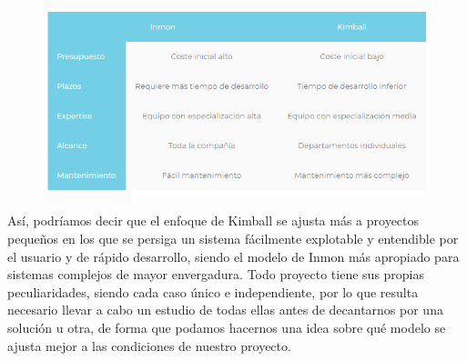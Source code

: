 \documentclass[preprint,12pt]{elsarticle}
\begin{document}
			\begin{figure}[htb]
				\begin{center}
					\includegraphics[width=15cm]{./IMAGENES/imgleydi4}
				\end{center}
			\end{figure}

Así, podríamos decir que el enfoque de Kimball se ajusta más a proyectos pequeños en los que se persiga un sistema fácilmente explotable y entendible por el usuario y de rápido desarrollo, siendo el modelo de Inmon más apropiado para sistemas complejos de mayor envergadura.
Todo proyecto tiene sus propias peculiaridades, siendo cada caso único e independiente, por lo que resulta necesario llevar a cabo un estudio de todas ellas antes de decantarnos por una solución u otra, de forma que podamos hacernos una idea sobre qué modelo se ajusta mejor a las condiciones de nuestro proyecto.



	
	
\end{document}
